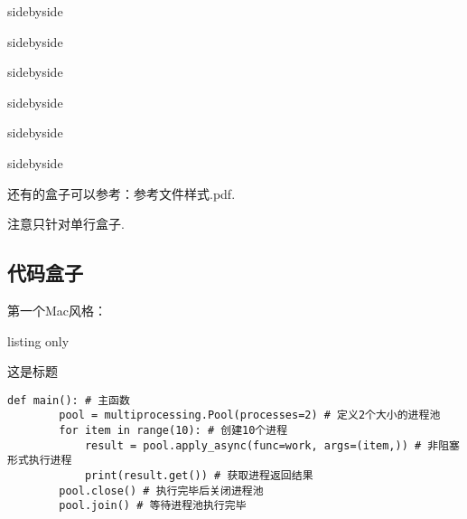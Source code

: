 \documentclass[a4]{ctexart}
\begin{document}
\begin{tcblisting}{sidebyside}
    
\end{tcblisting}

\begin{tcblisting}{sidebyside}
    
\end{tcblisting}


\begin{tcblisting}{sidebyside}
    
\end{tcblisting}

\begin{tcblisting}{sidebyside}
    
\end{tcblisting}

\begin{tcblisting}{sidebyside}
    
\end{tcblisting}

\begin{tcblisting}{sidebyside}
    
\end{tcblisting}

还有的盒子可以参考：参考文件样式.pdf.
\begin{marker}
    注意只针对单行盒子.
\end{marker}

\subsection{代码盒子}
第一个Mac风格：
\begin{tcblisting}{listing only}
\begin{macbox}{这是标题}
    \begin{lstlisting}[style=python4]
    def main(): # 主函数
        pool = multiprocessing.Pool(processes=2) # 定义2个大小的进程池
        for item in range(10): # 创建10个进程
            result = pool.apply_async(func=work, args=(item,)) # 非阻塞形式执行进程
            print(result.get()) # 获取进程返回结果
        pool.close() # 执行完毕后关闭进程池
        pool.join() # 等待进程池执行完毕
    \end{lstlisting}
\end{macbox}
\end{tcblisting}
\end{document}
